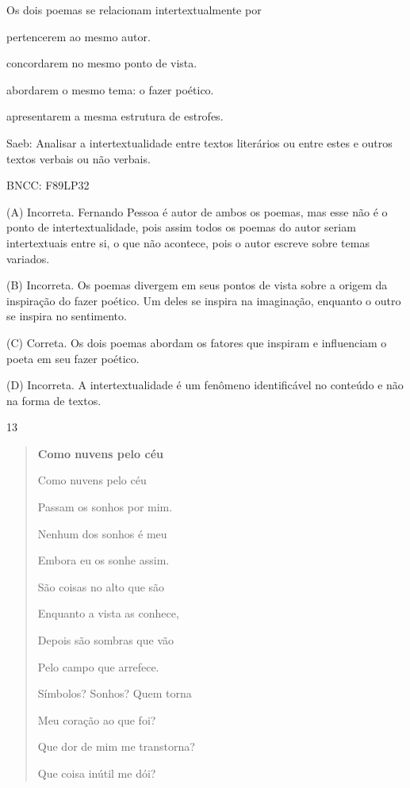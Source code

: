 
Os dois poemas se relacionam intertextualmente por

\begin{escolha}
\item pertencerem ao mesmo autor.

\item concordarem no mesmo ponto de vista.

\item abordarem o mesmo tema: o fazer poético.

\item apresentarem a mesma estrutura de estrofes.
\end{escolha}

Saeb: Analisar a intertextualidade entre textos literários ou entre
estes e outros textos verbais ou não verbais.

BNCC: F89LP32

(A) Incorreta. Fernando Pessoa é autor de ambos os poemas, mas esse não
é o ponto de intertextualidade, pois assim todos os poemas do autor
seriam intertextuais entre si, o que não acontece, pois o autor escreve
sobre temas variados.

(B) Incorreta. Os poemas divergem em seus pontos de vista sobre a origem
da inspiração do fazer poético. Um deles se inspira na imaginação,
enquanto o outro se inspira no sentimento.

(C) Correta. Os dois poemas abordam os fatores que inspiram e
influenciam o poeta em seu fazer poético.

(D) Incorreta. A intertextualidade é um fenômeno identificável no
conteúdo e não na forma de textos.

\num{13}

\begin{quote}
\textbf{Como nuvens pelo céu}

Como nuvens pelo céu

Passam os sonhos por mim.

Nenhum dos sonhos é meu

Embora eu os sonhe assim.

São coisas no alto que são

Enquanto a vista as conhece,

Depois são sombras que vão

Pelo campo que arrefece.

Símbolos? Sonhos? Quem torna

Meu coração ao que foi?

Que dor de mim me transtorna?

Que coisa inútil me dói?
\end{quote}

